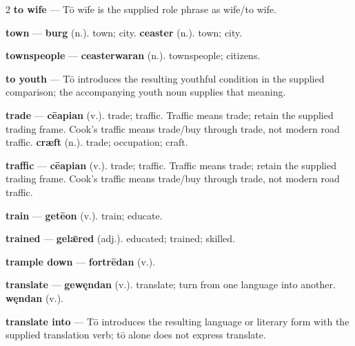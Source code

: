 \begin{multicols}{2}
\textbf{to wife} — Tō wīfe is the supplied role phrase as wife/to wife.\par
\textbf{town} — \textbf{burg} (n.). town; city. \textbf{ceaster} (n.). town; city.\par
\textbf{townspeople} — \textbf{ceasterwaran} (n.). townspeople; citizens.\par
\textbf{to youth} — Tō introduces the resulting youthful condition in the supplied comparison; the accompanying youth noun supplies that meaning.\par
\textbf{trade} — \textbf{cēapian} (v.). trade; traffic. Traffic means trade; retain the supplied trading frame. Cook's traffic means trade/buy through trade, not modern road traffic. \textbf{cræft} (n.). trade; occupation; craft.\par
\textbf{traffic} — \textbf{cēapian} (v.). trade; traffic. Traffic means trade; retain the supplied trading frame. Cook's traffic means trade/buy through trade, not modern road traffic.\par
\textbf{train} — \textbf{getēon} (v.). train; educate.\par
\textbf{trained} — \textbf{gelǣred} (adj.). educated; trained; skilled.\par
\textbf{trample down} — \textbf{fortrēdan} (v.).\par
\textbf{translate} — \textbf{gewęndan} (v.). translate; turn from one language into another. \textbf{węndan} (v.).\par
\textbf{translate into} — Tō introduces the resulting language or literary form with the supplied translation verb; tō alone does not express translate.\par

\end{multicols}

